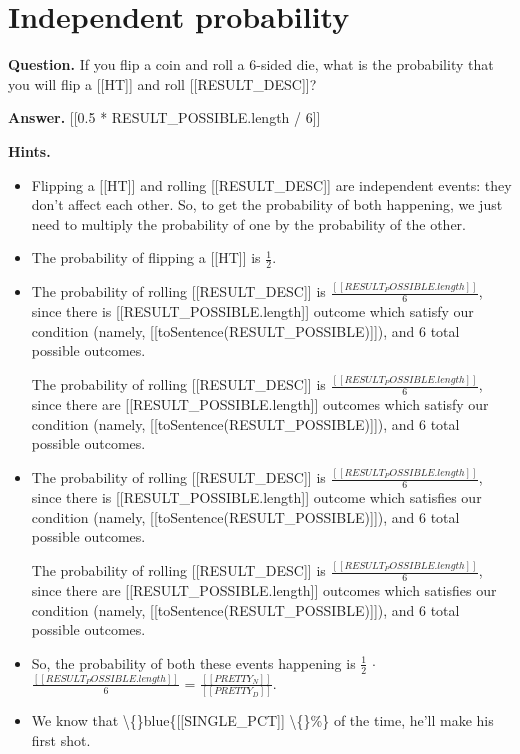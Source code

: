 \documentclass{article}
\begin{document}
\section*{Independent probability}
\textbf{Question.} If you flip a coin and roll a 6-sided die, what is the probability that you will flip a [[HT]] and roll [[RESULT\_DESC]]?

\textbf{Answer.} [[0.5 * RESULT\_POSSIBLE.length / 6]]

\textbf{Hints.}
\begin{itemize}
  \item Flipping a [[HT]] and rolling [[RESULT\_DESC]] are independent events: they don't affect each other. So, to get the
                    probability of both happening, we just need to multiply the probability of one by the probability of the other.
  \item The probability of flipping a [[HT]] is $\frac{1}{2}$.
  \item The probability of rolling [[RESULT\_DESC]] is $\frac{[[RESULT_POSSIBLE.length]]}{6}$, since there
                    is [[RESULT\_POSSIBLE.length]] outcome
                    which satisfy our condition
                    (namely, [[toSentence(RESULT\_POSSIBLE)]]), and 6 total possible outcomes.
                
                    The probability of rolling [[RESULT\_DESC]] is $\frac{[[RESULT_POSSIBLE.length]]}{6}$, since there
                    are [[RESULT\_POSSIBLE.length]] outcomes
                    which satisfy our condition
                    (namely, [[toSentence(RESULT\_POSSIBLE)]]), and 6 total possible outcomes.
  \item The probability of rolling [[RESULT\_DESC]] is $\frac{[[RESULT_POSSIBLE.length]]}{6}$, since there
                    is [[RESULT\_POSSIBLE.length]] outcome
                    which satisfies our condition
                    (namely, [[toSentence(RESULT\_POSSIBLE)]]), and 6 total possible outcomes.
                
                    The probability of rolling [[RESULT\_DESC]] is $\frac{[[RESULT_POSSIBLE.length]]}{6}$, since there
                    are [[RESULT\_POSSIBLE.length]] outcomes
                    which satisfies our condition
                    (namely, [[toSentence(RESULT\_POSSIBLE)]]), and 6 total possible outcomes.
  \item So, the probability of both these events happening is $\frac{1}{2}$ $\cdot$ $\frac{[[RESULT_POSSIBLE.length]]}{6}$
                    = $\frac{[[PRETTY_N]]}{[[PRETTY_D]]}$.
  \item We know that \textbackslash\{\}blue\{[[SINGLE\_PCT]] \textbackslash\{\}\%\} of the time, he'll make
                    his first shot.
                    

\end{itemize}
\end{document}
